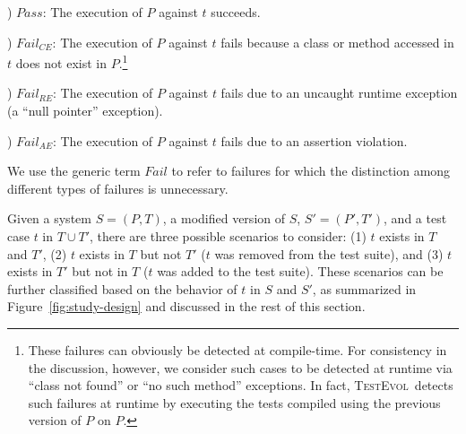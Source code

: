 \documentclass[conference]{IEEEtran}
\newcommand{\mt}{\mathit}
\newcommand{\pass}{\mt{Pass}}
\newcommand{\fail}{\mt{Fail}}
\newcommand{\failce}{\mt{Fail}_{CE}}
\newcommand{\failre}{\mt{Fail}_{RE}}
\newcommand{\failae}{\mt{Fail}_{AE}}
\newcommand{\covfunc}[2]{\mt{Cov(#1, #2)}}
\newcommand{\tool}{\textsc{TestEvol}\xspace}
\begin{document}
) $\pass$: The execution of $P$ against $t$ succeeds.

) $\failce$: The execution of $P$ against $t$ fails because a class
or method accessed in $t$ does not exist in $P$.\footnote{\small These
  failures can obviously be detected at compile-time. For consistency
  in the discussion, however, we consider such cases to be detected at
  runtime via ``class not found'' or ``no such method'' exceptions. In
  fact, \tool\ detects such failures at runtime by executing the tests
  compiled using the previous version of $P$ on $P$.}

) $\failre$: The execution of $P$ against $t$ fails due to an
uncaught runtime exception (\eg a ``null pointer'' exception).

) $\failae$: The execution of $P$ against $t$ fails due to an
assertion violation.

We use the generic term $\fail$ to refer to failures for which the
distinction among different types of failures is unnecessary.




Given a system $S = (P, T)$, a modified version of $S$, $S'=(P', T')$,
and a test case $t$ in $T \cup T'$, there are three possible scenarios
to consider: (1) $t$ exists in $T$ and $T'$, (2) $t$ exists in $T$ but
not $T'$ (\ie $t$ was removed from the test suite), and (3) $t$ exists
in $T'$ but not in $T$ (\ie $t$ was added to the test suite). These
scenarios can be further classified based on the behavior of $t$ in
$S$ and $S'$, as summarized in Figure~\ref{fig:study-design} and
discussed in the rest of this section.
\end{document}
